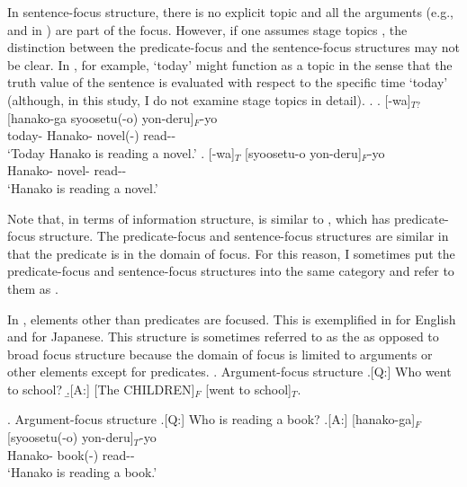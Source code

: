 In sentence-focus structure,
there is no explicit topic and all the arguments (e.g.,  and  in \Last[A]) are part of the focus.
However, if one assumes stage topics \cite{erteschik-shir97,erteschik-shir07},
the distinction between the predicate-focus and the sentence-focus structures may not be clear.
In \Next[a], for example,
 `today' might function as a topic in the sense that
the truth value of the sentence is evaluated with respect to the specific time `today' (although, in this study, I do not examine stage topics in detail).
\ex. 
	\ag. [-wa]$_{T?}$ [hanako-ga syoosetu(-o) yon-deru]$_{F}$-yo \\
		today- Hanako- novel(-) read-- \\
		`Today Hanako is reading a novel.'
		\bg. [-wa]$_{T}$ [syoosetu-o yon-deru]$_{F}$-yo \\
		Hanako- novel- read-- \\
		`Hanako is reading a novel.'

Note that, in terms of information structure,
\Last[a] is similar to \Last[b],
which has predicate-focus structure.
The predicate-focus and sentence-focus structures are similar
in that the predicate is in the domain of focus.
For this reason, I sometimes put the predicate-focus and sentence-focus structures into the same category
and refer to them as .

In ,
elements other than predicates are focused.
This is exemplified in \Next[A] for English
and \NNext[A] for Japanese.
This structure is sometimes referred to as the 
as opposed to broad focus structure
because the domain of focus is limited to arguments or other elements except for predicates.
\ex. Argument-focus structure
	\a.[Q:] Who went to school?
	\b.[A:] [The CHILDREN]$_{F}$ [went to school]$_{T}$. \hfill{\cite[][p.\ 121]{lambrecht94}}

\ex. Argument-focus structure
	\a.[Q:] Who is reading a book?
	\bg.[A:] [hanako-ga]$_{F}$ [syoosetu(-o) yon-deru]$_{T}$-yo \\
		Hanako- book(-) read-- \\
		`Hanako is reading a book.'

